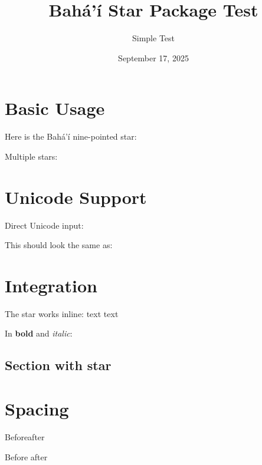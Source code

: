 \documentclass{article}
\begin{document}
\title{Bahá'í Star Package Test}
\author{Simple Test}
\date{September 17, 2025}
\maketitle

\section{Basic Usage}

Here is the Bahá'í nine-pointed star: \bahaistar

Multiple stars: \bahaistar{} \bahaistar{} \bahaistar

\section{Unicode Support}

Direct Unicode input: 🟙

This should look the same as: \bahaistar

\section{Integration}

The star works inline: text \bahaistar{} text

In \textbf{bold} and \textit{italic}: \textbf{\bahaistar} \textit{\bahaistar}

\subsection{Section with star \bahaistar}

\section{Spacing}

Before\bahaistar{}after

Before \bahaistar{} after
\end{document}
